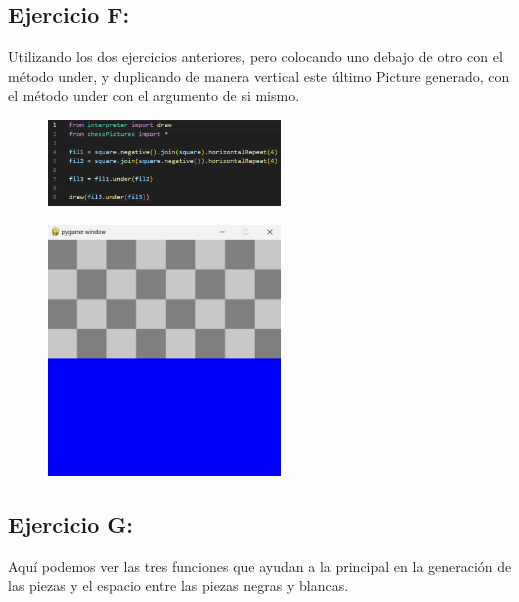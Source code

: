 \documentclass{article}
\begin{document}
	\subsection{Ejercicio F:}
	
	Utilizando los dos ejercicios anteriores, pero colocando uno debajo de otro con el método under, y duplicando de manera vertical este último Picture generado, con el método under con el argumento de si mismo.
	
	\begin{figure}[H]
		\centering
		\includegraphics[width=0.55\textwidth,keepaspectratio]{img/cap15.png}
	\end{figure}
	
	\begin{figure}[H]
		\centering
		\includegraphics[width=0.55\textwidth,keepaspectratio]{img/Picture F.png}
	\end{figure}	
	
	\subsection{Ejercicio G:}
	
	Aquí podemos ver las tres funciones que ayudan a la principal en la generación de las piezas y el espacio entre las piezas negras y blancas.
	
\end{document}
